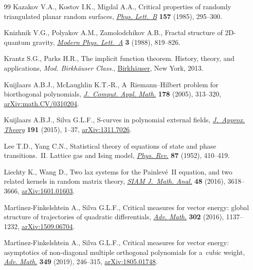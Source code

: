 \begin{thebibliography}{99}
Kazakov V.A., Kostov I.K., Migdal A.A., Critical properties of randomly
 triangulated planar random surfaces,
 \href{https://doi.org/10.1016/0370-2693(85)90669-0}{\textit{Phys. Lett.~B}}
 \textbf{157} (1985), 295--300.

Knizhnik V.G., Polyakov A.M., Zamolodchikov A.B., Fractal structure of
 {$2$}{D}-quantum gravity,
 \href{https://doi.org/10.1142/S0217732388000982}{\textit{Modern Phys.
 Lett.~A}} \textbf{3} (1988), 819--826.

Krantz S.G., Parks H.R., The implicit function theorem. History, theory, and
 applications, \textit{Mod. Birkh\"auser Class.},
 \href{https://doi.org/10.1007/978-1-4614-5981-1}{Birkh\"auser}, New York,
 2013.

Kuijlaars A.B.J., McLaughlin K.T.-R., A~{R}iemann--{H}ilbert problem for
 biorthogonal polynomials,
 \href{https://doi.org/10.1016/j.cam.2004.01.043}{\textit{J.~Comput. Appl.
 Math.}} \textbf{178} (2005), 313--320,
 \href{http://arxiv.org/abs/math.CV/0310204}{arXiv:math.CV/0310204}.

Kuijlaars A.B.J., Silva G.L.F., S-curves in polynomial external fields,
 \href{https://doi.org/10.1016/j.jat.2014.04.002}{\textit{J.~Approx. Theory}}
 \textbf{191} (2015), 1--37,
 \href{http://arxiv.org/abs/1311.7026}{arXiv:1311.7026}.

Lee T.D., Yang C.N., Statistical theory of equations of state and phase
 transitions.~{II}. {L}attice gas and {I}sing model,
 \href{https://doi.org/10.1103/PhysRev.87.410}{\textit{Phys. Rev.}}
 \textbf{87} (1952), 410--419.

Liechty K., Wang D., Two lax systems for the {P}ainlev\'e~{II} equation, and
 two related kernels in random matrix theory,
 \href{https://doi.org/10.1137/16M1056080}{\textit{SIAM J.~Math. Anal.}}
 \textbf{48} (2016), 3618--3666,
 \href{http://arxiv.org/abs/1601.01603}{arXiv:1601.01603}.

Mart\'{\i}nez-Finkelshtein A., Silva G.L.F., Critical measures for vector
 energy: global structure of trajectories of quadratic differentials,
 \href{https://doi.org/10.1016/j.aim.2016.08.009}{\textit{Adv. Math.}}
 \textbf{302} (2016), 1137--1232,
 \href{http://arxiv.org/abs/1509.06704}{arXiv:1509.06704}.

Mart\'{\i}nez-Finkelshtein A., Silva G.L.F., Critical measures for vector
 energy: asymptotics of non-diagonal multiple orthogonal polynomials for
 a~cubic weight, \href{https://doi.org/10.1016/j.aim.2019.04.010}{\textit{Adv.
 Math.}} \textbf{349} (2019), 246--315,
 \href{http://arxiv.org/abs/1805.01748}{arXiv:1805.01748}.


\end{thebibliography}
